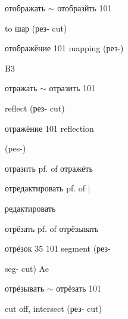 \begin{minipage}[t]{0.475\textwidth}
\noindent отображать $\sim$ отобразйть 101\par
\noindent to шар (рез- cut)\par
\noindent отображёние 101 mapping (рез-)\par
\noindent B3\par
\noindent отражать $\sim$ отразить 101\par
\noindent reflect (рез- cut)\par
\noindent отражёние 101 reflection\par
\noindent (pes-)\par
\noindent отразить pf. of отражёть\par
\noindent отредактировать pf. of |\par
\noindent редактировать\par
\noindent отрёзать pf. of отрёзывать\par
\noindent отрёзок 35 101 segment (рез-\par
\noindent seg- cut) Ae\par
\noindent отрёзывать $\sim$ отрёзать 101\par
\noindent cut off, intersect (рез- cut)\par
\end{minipage}\hfill
